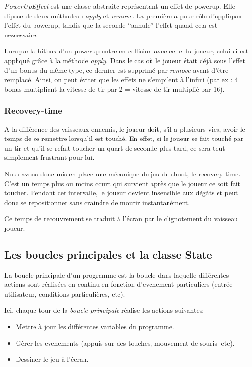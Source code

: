 \documentclass{article}
\begin{document}
\emph{PowerUpEffect} est une classe abstraite représentant un effet de powerup.
Elle dipose de deux méthodes : \emph{apply} et \emph{remove}. La première a pour
rôle d'appliquer l'effet du powerup, tandis que la seconde ``annule'' l'effet
quand cela est nescessaire.

Lorsque la hitbox d'un powerup entre en collision avec celle du joueur, celui-ci
est appliqué grâce à la méthode \emph{apply}. Dans le cas où le joueur était
déjà sous l'effet d'un bonus du même type, ce dernier est supprimé par
\emph{remove} avant d'être remplacé. Ainsi, on peut éviter que les effets ne
s'empilent à l'infini (par ex : 4 bonus multipliant la vitesse de tir par 2 =
vitesse de tir multiplié par 16).


\subsubsection{Recovery-time}

A la différence des vaisseaux ennemis, le joueur doit, s'il a plusieurs vies,
avoir le temps de se remettre lorsqu'il est touché. En effet, si le joueur se
fait touché par un tir et qu'il se refait toucher un quart de seconde plus tard,
ce sera tout simplement frustrant pour lui. \newline

Nous avons donc mis en place une mécanique de jeu de shoot, le recovery time.
C'est un temps plus ou moins court qui survient après que le joueur ce soit fait
toucher. Pendant cet intervalle, le joueur devient insensible aux dégâts et peut
donc se repositionner sans craindre de mourir instantanément. \newline

Ce temps de recouvrement se traduit à l'écran par le clignotement du vaisseau
joueur. \newpage


\subsection{Les boucles principales et la classe State}

La boucle principale d'un programme est la boucle dans laquelle différentes
actions sont réalisées en continu en fonction d'evenement particuliers (entrée
utilisateur, conditions particulières, etc).

Ici, chaque tour de la \emph{boucle principale} réalise les actions suivantes:
\begin{itemize}
    \item Mettre à jour les différentes variables du programme.
    \item Gèrer les evenements (appuis sur des touches, mouvement de souris,
        etc).
    \item Dessiner le jeu à l'écran.
\end{itemize}
\end{document}
